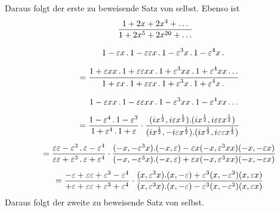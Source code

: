 Daraus folgt der erste zu beweisende Satz von selbst. Ebenso ist
\[
\begin{gathered}
\frac{1+2x+2x^4+\mathinner{.\,.\,.}}{1+2x^5+2x^{20}+\mathinner{.\,.\,.}}\\[8pt]
\quad=\dfrac{\begin{gathered}1-\varepsilon x\,.\,1-\varepsilon\varepsilon x\,.\,1-\varepsilon^3x\,.\,1-\varepsilon^4x\,.\,\\[6pt]1+\varepsilon xx\,.\,1+\varepsilon\varepsilon xx\,.\,1+\varepsilon^3xx\,.\,1+\varepsilon^4xx\mathinner{.\,.\,.}\end{gathered}}
 {\begin{gathered}1+\varepsilon x\,.\,1+\varepsilon\varepsilon x\,.\,1+\varepsilon^3x\,.\,1+\varepsilon^4x\,.\,\\[6pt]1-\varepsilon xx\,.\,1-\varepsilon\varepsilon xx\,.\,1-\varepsilon^3xx\,.\,1-\varepsilon^4xx\mathinner{.\,.\,.}\end{gathered}}\\[1ex]
\quad=\frac{1-\varepsilon^4\,.\,1-\varepsilon^3}{1+\varepsilon^4\,.\,1+\varepsilon}
 \cdot\frac{(ix^{\frac12},i\varepsilon x^{\frac12}).(ix^{\frac12},i\varepsilon\varepsilon x^{\frac12})}
 {(ix^{\frac12},-i\varepsilon x^{\frac12}).(ix^{\frac12},i\varepsilon\varepsilon x^{\frac12})}\\[1ex]
\quad=\frac{\varepsilon\varepsilon-\varepsilon^3\,.\,\varepsilon-\varepsilon^4}
 {\varepsilon\varepsilon+\varepsilon^3\,.\,\varepsilon+\varepsilon^4}
 \cdot\frac{(-x,-\varepsilon^3x).(-x,\varepsilon)-\varepsilon x(-x,\varepsilon^3xx)(-x,-\varepsilon x)}
 {(-x,-\varepsilon^3x).(-x,\varepsilon)+\varepsilon x(-x,\varepsilon^3xx)(-x,-\varepsilon x)}\\[1ex]
\quad=\frac{-\varepsilon+\varepsilon\varepsilon+\varepsilon^3-\varepsilon^4}
 {+\varepsilon+\varepsilon\varepsilon+\varepsilon^3+\varepsilon^4}
 \cdot\frac{(x,\varepsilon^3x).(x,-\varepsilon)+\varepsilon^3(x,-\varepsilon^3)(x,\varepsilon x)}
 {(x,\varepsilon^3x).(x,-\varepsilon)-\varepsilon^3(x,-\varepsilon^3)(x,\varepsilon x)}
\end{gathered}
\]
Daraus folgt der zweite zu beweisende Satz von selbst.

\clearpage
\endgroup
